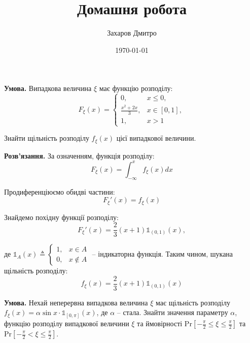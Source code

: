 \documentclass[oneside,solution]{karazin-prob-theory-assign}
\title{Домашня робота}
\author{Захаров Дмитро}
\date{\today}
\begin{document}
\maketitle



\hspace{20px}\textbf{Умова.} Випадкова величина $\xi$ має функцію розподілу:
\begin{equation*}
    F_{\xi}(x) = \begin{cases}
        0, & x \leq 0, \\
        \frac{x^2+2x}{3}, & x \in [0,1], \\
        1, & x > 1
    \end{cases}
\end{equation*}

Знайти щільність розподілу $f_{\xi}(x)$ цієї випадкової величини.

\textbf{Розв'язання.} За означенням, функція розподілу:
\begin{equation}
    F_{\xi}(x) = \int_{-\infty}^x f_{\xi}(x)dx
\end{equation}

Продиференціюємо обидві частини:
\begin{equation}
    F_{\xi}'(x) = f_{\xi}(x)
\end{equation}

Знайдемо похідну функції розподілу:
\begin{equation}
    F_{\xi}'(x) = \frac{2}{3}(x+1)\mathds{1}_{(0,1)}(x),
\end{equation}

де $\mathds{1}_{A}(x) \triangleq \begin{cases}
    1, & x \in A \\
    0, & x \not\in A
\end{cases}$ -- індикаторна функція. Таким чином, шукана щільність розподілу:
\begin{equation}
    \boxed{f_{\xi}(x) = \frac{2}{3}(x+1)\mathds{1}_{(0,1)}(x)}
\end{equation}


\hspace{20px}\textbf{Умова.} Нехай неперервна випадкова величина $\xi$ має щільність розподілу $f_{\xi}(x) = \alpha \sin x \cdot \mathds{1}_{[0,\pi]}(x)$, де $\alpha$ -- стала. Знайти значення параметру $\alpha$, функцію розподілу випадкової величини $\xi$ та ймовірності $\text{Pr}\left[-\frac{\pi}{2} \leq \xi \leq \frac{\pi}{2}\right]$ та $\text{Pr}\left[-\frac{\pi}{2} < \xi \leq \frac{\pi}{2}\right]$.
\end{document}
